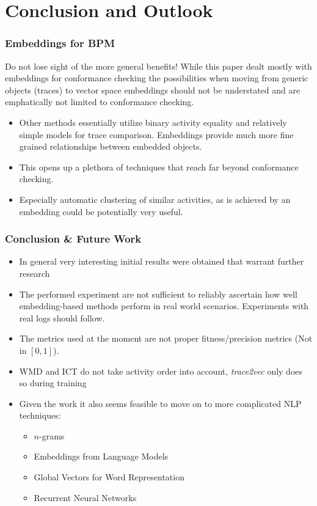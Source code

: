 \documentclass{beamer}
\begin{document}
\section{Conclusion and Outlook}
\begin{frame}
	\frametitle{Embeddings for BPM}
	\begin{exampleblock}{Do not lose sight of the more general benefits!}
		While this paper dealt mostly with embeddings for conformance checking the possibilities when moving from generic objects (traces) to vector space embeddings should not be understated and are emphatically not limited to conformance checking. 
	\end{exampleblock}
	
	
	\begin{itemize}
		\item Other methods essentially utilize binary activity equality and relatively simple models for trace comparison. Embeddings provide much more fine grained relationships between embedded objects.
		\item This opens up a plethora of techniques that reach far beyond conformance checking.
		\item Especially automatic clustering of similar activities, as is achieved by an embedding could be potentially very useful.
	\end{itemize}
	 
\end{frame}

\begin{frame}
	\frametitle{Conclusion \& Future Work}
	\begin{itemize}
		\item In general very interesting initial results were obtained that warrant further research
		\item The performed experiment are not sufficient to reliably ascertain how well embedding-based methods perform in real world scenarios. Experiments with real logs should follow.
		\item The metrics used at the moment are not proper fitness/precision metrics (Not in $[0,1]$).
		\item WMD and ICT do not take activity order into account, \emph{trace2vec} only does so during training
		\item Given the work it also seems feasible to move on to more complicated NLP techniques:
		\begin{itemize}
			\item $n$-grams
			\item Embeddings from Language Models
			\item Global Vectors for Word Representation
			\item Recurrent Neural Networks
		\end{itemize}
	\end{itemize}
\end{frame}
\end{document}
